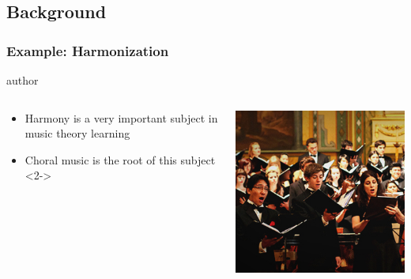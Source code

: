 \documentclass[english,handout]{beamer}
\begin{document}
\subsection{Background}
\begin{frame}
	\frametitle{Example: Harmonization}
			\begin{beamercolorbox}[leftskip=8cm,center,wd=0.7\textwidth]{author}
			\begin{columns}[T]
			\begin{column}{.60\textwidth}%
\begin{itemize}
		\item \alert{Harmony} is a very important subject in music theory learning
		\item \alert{Choral} music is the root of this subject
		<2->
	\end{itemize}
			\end{column}
			\begin{column}{.39\textwidth}%
			\includegraphics[width=\linewidth]{imagenes/tsjsu_choir_02.jpg}
			\end{column}
			\end{columns}
			\end{beamercolorbox}
	
\end{frame}
\end{document}
